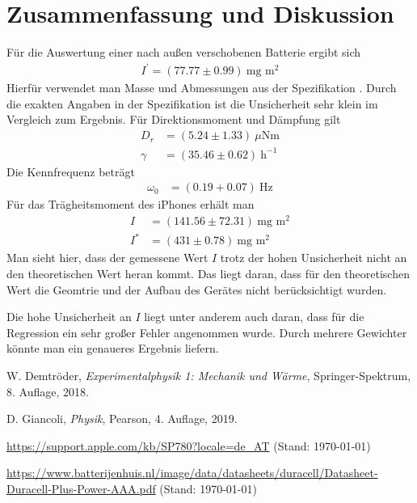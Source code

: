\documentclass{article}
\begin{document}
\newpage
\section{Zusammenfassung und Diskussion}

Für die Auswertung einer nach außen verschobenen Batterie ergibt sich
\begin{align*}
I^\prime = (77.77 \pm 0.99)~\text{mg m}^2
\end{align*}
Hierfür verwendet man Masse und Abmessungen aus der Spezifikation \cite{duracell}. Durch die exakten Angaben in der Spezifikation ist die Unsicherheit sehr klein im Vergleich zum Ergebnis. Für Direktionsmoment und Dämpfung gilt
\begin{align}
D_r &= (5.24 \pm 1.33)~\mu\text{Nm} \\
\gamma &= (35.46 \pm 0.62)~\text{h}^{-1}
\end{align}
Die Kennfrequenz beträgt
\begin{align}
\omega_0 &= (0.19 + 0.07)~\text{Hz}
\end{align}
Für das Trägheitsmoment des iPhones erhält man
\begin{align}
I &= (141.56 \pm 72.31)~\text{mg~m}^2 \\
I^* &= (431 \pm 0.78)~\text{mg~m}^2
\end{align}
Man sieht hier, dass der gemessene Wert $I$ trotz der hohen Unsicherheit nicht an den theoretischen Wert heran kommt. Das liegt daran, dass für den theoretischen Wert die Geomtrie und der Aufbau des Gerätes nicht berücksichtigt wurden.

Die hohe Unsicherheit an $I$ liegt unter anderem auch daran, dass für die Regression ein sehr großer Fehler angenommen wurde. Durch mehrere Gewichter könnte man ein genaueres Ergebnis liefern.

\begin{thebibliography}{9}
 W. Demtröder, \emph{Experimentalphysik 1: Mechanik und Wärme}, Springer-Spektrum, 8. Auflage, 2018.

 D. Giancoli, \emph{Physik}, Pearson, 4. Auflage, 2019.

 \url{https://support.apple.com/kb/SP780?locale=de_AT} (Stand: \today)

 \url{https://www.batterijenhuis.nl/image/data/datasheets/duracell/Datasheet-Duracell-Plus-Power-AAA.pdf} (Stand: \today) 

\end{thebibliography}
\end{document}
